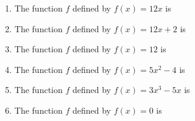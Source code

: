 \documentclass{ximera}
\author{Kenneth Berglund}
\begin{document}
\licenseSZ
\begin{exercise}
\begin{enumerate}
\item The function $f$ defined by $f(x) = 12x$ is
\begin{multipleChoice}
\end{multipleChoice}

\item The function $f$ defined by $f(x) = 12x + 2$ is
\begin{multipleChoice}
\end{multipleChoice}

\item The function $f$ defined by $f(x) = 12$ is
\begin{multipleChoice}
\end{multipleChoice}

\item The function $f$ defined by $f(x) = 5x^2 - 4$ is
\begin{multipleChoice}
\end{multipleChoice}

\item The function $f$ defined by $f(x) = 3x^3 - 5x$ is
\begin{multipleChoice}
\end{multipleChoice}

\item The function $f$ defined by $f(x) = 0$ is
\begin{multipleChoice}
\end{multipleChoice}

\end{enumerate}
\end{exercise}
\end{document}

